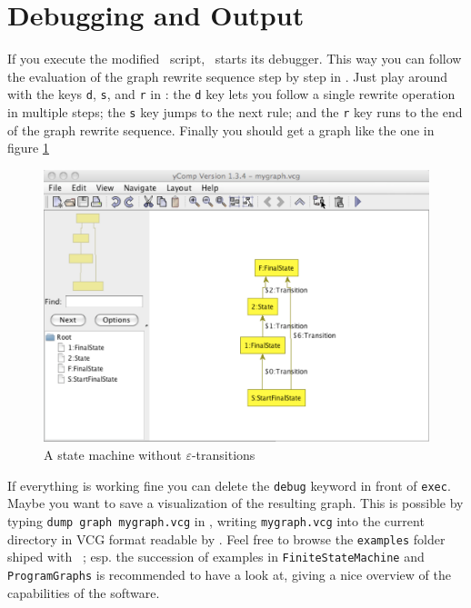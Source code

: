 \section{Debugging and Output}
If you execute the modified \GrShell\ script, \GrG\ starts its debugger.
This way you can follow the evaluation of the graph rewrite sequence step by step in \yComp.
Just play around with the keys \texttt{d}, \texttt{s}, and \texttt{r} in \GrShell: the \texttt{d} key lets you follow a single rewrite operation in multiple steps; the \texttt{s} key jumps to the next rule; and the \texttt{r} key runs to the end of the graph rewrite sequence.
Finally you should get a graph like the one in figure \ref{fig:quick:final}
\begin{figure}[htbp]
	\centering
	\includegraphics[width=0.8\linewidth]{fig/quickfinal}
	\caption{A state machine without $\varepsilon$-transitions}
	\label{fig:quick:final}
\end{figure}

If everything is working fine you can delete the \texttt{debug} keyword in front of \texttt{exec}.
Maybe you want to save a visualization of the resulting graph.
This is possible by typing \texttt{dump graph mygraph.vcg} in \GrShell,
writing \texttt{mygraph.vcg} into the current directory in VCG format readable by \yComp.
Feel free to browse the \texttt{examples} folder shiped with \GrG\ ;
esp. the succession of examples in \texttt{FiniteStateMachine} and \texttt{ProgramGraphs}
is recommended to have a look at, giving a nice overview of the capabilities of the software.

